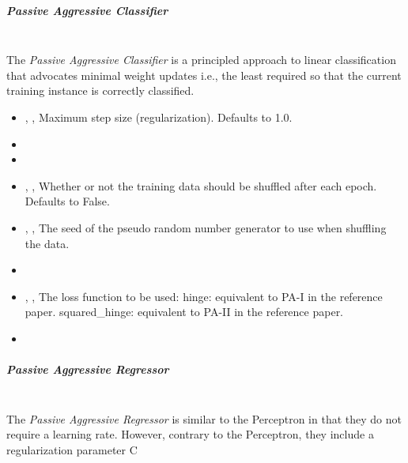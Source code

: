 \subparagraph{Passive Aggressive Classifier}
\mbox{}
\\The \textit{Passive Aggressive Classifier} is a principled approach to linear
classification that advocates minimal weight updates i.e., the least required so
that the current training instance is correctly classified.
%
\begin{itemize}
  \item {} , ,
  Maximum step size (regularization).
  Defaults to 1.0.
  \item {}
  \item {}
  \item {} , ,
  Whether or not the training data should be shuffled after each epoch.
  Defaults to False.
  \item {} , ,
  The seed of the pseudo random number generator to use when shuffling the data.
  \item \verDescriptionB
  \item {} , ,
  The loss function to be used: hinge: equivalent to PA-I in the reference
  paper.
  squared\_hinge: equivalent to PA-II in the reference paper.
  \item \warmStartDescription{}
\end{itemize}

\subparagraph{Passive Aggressive Regressor}
\mbox{}
\\The \textit{Passive Aggressive Regressor} is similar to the Perceptron in that
they do not require a learning rate.
%
However, contrary to the Perceptron, they include a regularization parameter C

